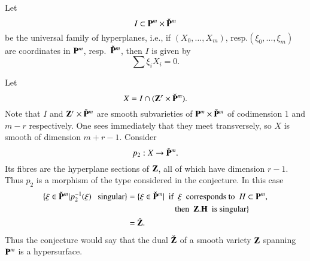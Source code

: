 Let
$$
I\subset \mathbf{P}^{m}\times \check{\mathbf{P}}^{m}
$$
be the universal family of hyperplanes, i.e., if
$(X_{0},\ldots,X_{m})$, resp.\break $(\xi_{0},\ldots,\xi_{m})$ are
coordinates in $\mathbf{P}^{m}$, resp.~$\check{\mathbf{P}}^{m}$, then $I$ is given
by 
$$
\sum \xi_{i}X_{i}=0.
$$

Let
$$
X=I\cap (\mathbf{Z}^{r}\times \check{\mathbf{P}}^{m}).
$$
Note that $I$ and $\mathbf{Z}^{r}\times \check{\mathbf{P}}^{m}$ are smooth
subvarieties of $\mathbf{P}^{m}\times \check{\mathbf{P}}^{m}$ of codimension 1 and
$m-r$ respectively. One sees immediately that they meet transversely,
so $X$ is smooth of dimension $m+r-1$. Consider
$$
p_{2}:X\to \check{\mathbf{P}}^{m}.
$$
Its fibres are the hyperplane sections of $\mathbf{Z}$, all of which have
dimension $r-1$. Thus $p_{2}$ is a morphism of the type considered in
the conjecture. In this case
\begin{align*}
\{\xi \in \check{\mathbf{P}}^{m}|p_{2}^{-1}(\xi)\text{~~ singular}\}
&= \{\xi\in \check{\mathbf{P}}^{m}|\text{~ if~ }\xi\text{~ corresponds to~ }
H\subset \mathbf{P}^{m},\\
 &\hspace{2cm} \text{then~ } \mathbf{Z}.\mathbf{H}\text{~ is singular}\}\\
&= \check{\mathbf{Z}}.
\end{align*}
Thus the conjecture would say that the dual $\check{\mathbf{Z}}$ of a smooth
variety $\mathbf{Z}$ spanning $\mathbf{P}^{m}$ is a hypersurface.

